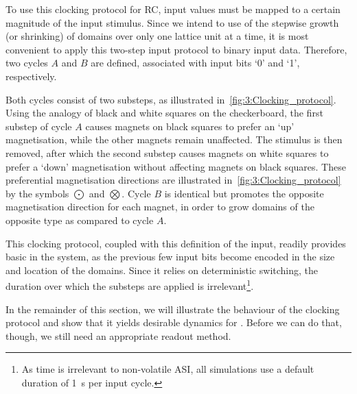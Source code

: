 To use this clocking protocol for RC, input values must be mapped to a certain magnitude of the input stimulus.
Since we intend to use of the stepwise growth (or shrinking) of domains over only one lattice unit at a time, it is most convenient to apply this two-step input protocol to binary input data.
Therefore, two cycles $A$ and $B$ are defined, associated with input bits `0' and `1', respectively. \par
Both cycles consist of two substeps, as illustrated in~\cref{fig:3:Clocking_protocol}.
Using the analogy of black and white squares on the checkerboard, the first substep of cycle $A$ causes magnets on black squares to prefer an `up' magnetisation, while the other magnets remain unaffected.
The stimulus is then removed, after which the second substep causes magnets on white squares to prefer a `down' magnetisation without affecting magnets on black squares.
These preferential magnetisation directions are illustrated in~\cref{fig:3:Clocking_protocol} by the symbols $\bigodot$ and $\bigotimes$.
Cycle $B$ is identical but promotes the opposite magnetisation direction for each magnet, in order to grow domains of the opposite type as compared to cycle $A$. \\\par
This clocking protocol, coupled with this definition of the input, readily provides basic  in the system, as the previous few input bits become encoded in the size and location of the domains.
Since it relies on deterministic switching, the duration over which the substeps are applied is irrelevant\footnote{
	As time is irrelevant to non-volatile ASI, all simulations use a default duration of \SI{1}{\second} per input cycle.
}. \par
In the remainder of this section, we will illustrate the behaviour of the clocking protocol and show that it yields desirable dynamics for .
Before we can do that, though, we still need an appropriate readout method.

